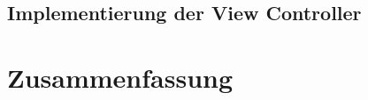 \documentclass{scrreprt}
\begin{document}
\section{Implementierung der View Controller}


\newpage
\chapter{Zusammenfassung}
\end{document}

